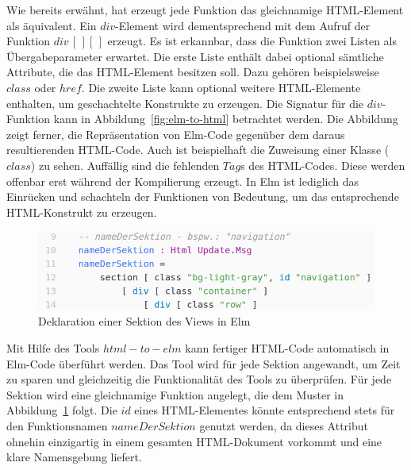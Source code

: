 Wie bereits erwähnt, hat erzeugt jede Funktion das gleichnamige \ac{HTML}-Element als äquivalent. Ein $div$-Element wird dementsprechend mit dem Aufruf der Funktion $div\,[\,][\,]$  erzeugt. Es ist erkannbar, dass die Funktion zwei Listen als Übergabeparameter erwartet. Die erste Liste enthält dabei optional sämtliche Attribute, die das \ac{HTML}-Element besitzen soll. Dazu gehören beispielsweise $class$ oder $href$. Die zweite Liste kann optional weitere \ac{HTML}-Elemente enthalten, um geschachtelte Konstrukte zu erzeugen. Die Signatur für die $div$-Funktion kann in Abbildung~\ref{fig:elm-to-html} betrachtet werden. Die Abbildung zeigt ferner, die Repräsentation von Elm-Code gegenüber dem daraus resultierenden \ac{HTML}-Code. Auch ist beispielhaft die Zuweisung einer Klasse ($class$) zu sehen. Auffällig sind die fehlenden $Tag$s des \ac{HTML}-Codes. Diese werden offenbar erst während der Kompilierung erzeugt. In Elm ist lediglich das Einrücken und schachteln der Funktionen von Bedeutung, um das entsprechende \ac{HTML}-Konstrukt zu erzeugen.
\begin{figure}[htb]
\centering
\includegraphics[scale=0.3]{img/elm-html-sections.png}
\caption{Deklaration einer Sektion des Views in Elm}\label{fig:elm-view-section}
\end{figure}

Mit Hilfe des Tools $html-to-elm$ kann fertiger \ac{HTML}-Code automatisch in Elm-Code überführt werden. Das Tool wird für jede Sektion angewandt, um Zeit zu sparen und gleichzeitig die Funktionalität des Tools zu überprüfen. Für jede Sektion wird eine gleichnamige Funktion angelegt, die dem Muster in Abbildung~\ref{fig:elm-view-section} folgt. Die $id$ eines \ac{HTML}-Elementes könnte entsprechend stets für den Funktionsnamen $nameDerSektion$ genutzt werden, da dieses Attribut ohnehin einzigartig in einem gesamten \ac{HTML}-Dokument vorkommt und eine klare Namensgebung liefert.


